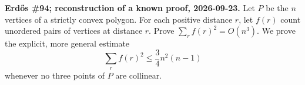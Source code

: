 \textbf{Erd\H{o}s \#94; reconstruction of a known proof, 2026-09-23.}
Let $P$ be the $n$ vertices of a strictly convex polygon. For each positive distance $r$, let $f(r)$ count unordered pairs of vertices at distance $r$. Prove $\sum_r f(r)^2=O(n^3)$. We prove the explicit, more general estimate
\[
\sum_r f(r)^2\leq\frac34n^2(n-1)
\tag{1}
\]
whenever no three points of $P$ are collinear.
